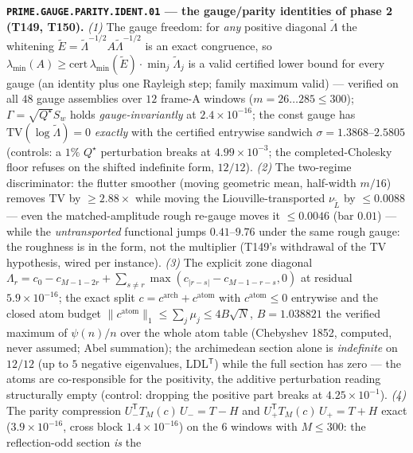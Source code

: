 \par\smallskip\noindent\textbf{\texttt{PRIME.GAUGE.PARITY.IDENT.01} --- the
gauge/parity identities of phase 2 (T149, T150).}
\emph{(1)} The gauge freedom: for \emph{any} positive diagonal
$\tilde\Lambda$ the whitening $\tilde E=\tilde\Lambda^{-1/2}A
\tilde\Lambda^{-1/2}$ is an exact congruence, so
$\lambda_{\min}(A)\ge\mathrm{cert}\,\lambda_{\min}(\tilde E)\cdot
\min_j\tilde\Lambda_j$ is a valid certified lower bound for every gauge (an
identity plus one Rayleigh step; family maximum valid) --- verified on all
$48$ gauge assemblies over $12$ frame-A windows ($m=26\ldots285\le300$);
$\Gamma=\sqrt{Q^\star}S_w$ holds \emph{gauge-invariantly} at
$2.4\times10^{-16}$; the const gauge has
$\mathrm{TV}(\log\tilde\Lambda)=0$ \emph{exactly} with the certified
entrywise sandwich $\sigma=1.3868$--$2.5805$ (controls: a $1\%$ $Q^\star$
perturbation breaks at $4.99\times10^{-3}$; the completed-Cholesky floor
refuses on the shifted indefinite form, $12/12$). \emph{(2)} The two-regime
discriminator: the flutter smoother (moving geometric mean, half-width
$m/16$) removes $\mathrm{TV}$ by $\ge2.88\times$ while moving the
Liouville-transported $\nu_{\tilde L}$ by $\le0.0088$ --- even the
matched-amplitude rough re-gauge moves it $\le0.0046$ (bar $0.01$) --- while
the \emph{untransported} functional jumps $0.41$--$9.76$ under the same
rough gauge: the roughness is in the form, not the multiplier (T149's
withdrawal of the TV hypothesis, wired per instance). \emph{(3)} The
explicit zone diagonal
$\Lambda_r=c_0-c_{M-1-2r}+\sum_{s\ne r}\max(c_{|r-s|}-c_{M-1-r-s},0)$ at
residual $5.9\times10^{-16}$; the exact split
$c=c^{\mathrm{arch}}+c^{\mathrm{atom}}$ with $c^{\mathrm{atom}}\le0$
entrywise and the closed atom budget
$\|c^{\mathrm{atom}}\|_1\le\sum_j\mu_j\le4B\sqrt N$, $B=1.038821$ the
verified maximum of $\psi(n)/n$ over the whole atom table (Chebyshev 1852,
computed, never assumed; Abel summation); the archimedean section alone is
\emph{indefinite} on $12/12$ (up to $5$ negative eigenvalues,
LDL$^{\mathsf T}$) while the full section has zero --- the atoms are
co-responsible for the positivity, the additive perturbation reading
structurally empty (control: dropping the positive part breaks at
$4.25\times10^{-1}$). \emph{(4)} The parity compression
$U_-^{\mathsf T}T_M(c)\,U_-=T-H$ and $U_+^{\mathsf T}T_M(c)\,U_+=T+H$
exact ($3.9\times10^{-16}$, cross block $1.4\times10^{-16}$) on the $6$
windows with $M\le300$: the reflection-odd section \emph{is} the
